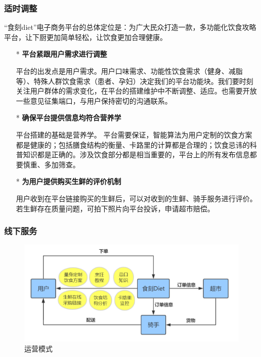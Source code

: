 \documentclass[UTF8,12pt]{ctexart}
\numberwithin{figure}{section}%
\begin{document}
\begin{spacing}{2}
\subsubsection{适时调整}
“食刻diet”电子商务平台的总体定位是：为广大民众打造一款，多功能化饮食攻略平台，让下厨更加简单轻松，让饮食更加合理健康。




	\begin{itemize}
	\item[*] \textbf{平台紧跟用户需求进行调整 }
	
	\setlength{\parindent}{2em}平台的出发点是用户需求。用户口味需求、功能性饮食需求（健身、减脂等）、特殊人群饮食需求（患者、孕妇）决定我们的平台功能块。我们要时刻关注用户群体的需求变化，在平台的搭建维护中不断调整、适应。也需要开放一些意见征集端口，与用户保持密切的沟通联系。		
	
	\item[*] \textbf{确保平台提供信息均符合营养学 }
	
	\setlength{\parindent}{2em}平台搭建的基础是营养学。 平台需要保证，智能算法为用户定制的饮食方案都是健康的；包括膳食结构的衡量、卡路里的计算都是合理的；饮食忌讳的科普知识都是正确的。涉及饮食部分都是相当重要的，平台上的所有发布信息都要慎重、多加筛查。
	
	\item[*] \textbf{为用户提供购买生鲜的评价机制 }
	
	\setlength{\parindent}{2em}用户收到在平台链接购买的生鲜后，可以对收到的生鲜、骑手服务进行评价。若生鲜存在质量问题，可拍下照片向平台投诉，申请超市赔偿。	
\end{itemize}

\newpage

\subsubsection{线下服务}

\begin{figure}[!htb]
	\centering
	\includegraphics[width=13cm]{fig/2}
	\caption{运营模式}
\end{figure}


\end{spacing}
\end{document}
